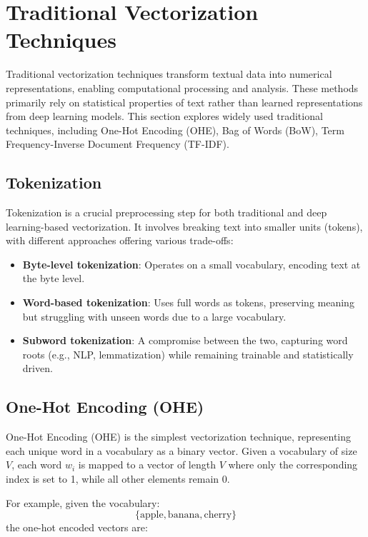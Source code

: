 \section{Traditional Vectorization Techniques}
Traditional vectorization techniques transform textual data into numerical representations, enabling computational processing and analysis. These methods primarily rely on statistical properties of text rather than learned representations from deep learning models. This section explores widely used traditional techniques, including One-Hot Encoding (OHE), Bag of Words (BoW), Term Frequency-Inverse Document Frequency (TF-IDF).

\subsection{Tokenization}  
Tokenization is a crucial preprocessing step for both traditional and deep learning-based vectorization. It involves breaking text into smaller units (tokens), with different approaches offering various trade-offs:  

\begin{itemize}  
    \item \textbf{Byte-level tokenization}: Operates on a small vocabulary, encoding text at the byte level.  
    \item \textbf{Word-based tokenization}: Uses full words as tokens, preserving meaning but struggling with unseen words due to a large vocabulary.  
    \item \textbf{Subword tokenization}: A compromise between the two, capturing word roots (e.g., NLP, lemmatization) while remaining trainable and statistically driven.  
\end{itemize}  



\subsection{One-Hot Encoding (OHE)}

One-Hot Encoding (OHE) is the simplest vectorization technique, representing each unique word in a vocabulary as a binary vector. Given a vocabulary of size \( V \), each word \( w_i \) is mapped to a vector of length \( V \) where only the corresponding index is set to 1, while all other elements remain 0. 

For example, given the vocabulary:
\[
\{ \text{apple}, \text{banana}, \text{cherry} \}
\]
the one-hot encoded vectors are:

